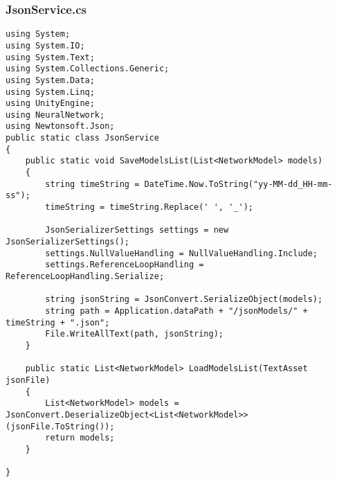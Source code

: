 \documentclass[12pt,a4paper]{article}
\begin{document}
\subsubsection*{JsonService.cs}
\begin{lstlisting}
using System;
using System.IO;
using System.Text;
using System.Collections.Generic;
using System.Data;
using System.Linq;
using UnityEngine;
using NeuralNetwork;
using Newtonsoft.Json;
public static class JsonService
{
    public static void SaveModelsList(List<NetworkModel> models)
    {
        string timeString = DateTime.Now.ToString("yy-MM-dd_HH-mm-ss");
        timeString = timeString.Replace(' ', '_');

	    JsonSerializerSettings settings = new JsonSerializerSettings();
	    settings.NullValueHandling = NullValueHandling.Include;
	    settings.ReferenceLoopHandling = ReferenceLoopHandling.Serialize;

        string jsonString = JsonConvert.SerializeObject(models);
        string path = Application.dataPath + "/jsonModels/" + timeString + ".json";
        File.WriteAllText(path, jsonString);
    }

    public static List<NetworkModel> LoadModelsList(TextAsset jsonFile)
    {
        List<NetworkModel> models = JsonConvert.DeserializeObject<List<NetworkModel>>(jsonFile.ToString());
    	return models;
    }

}
\end{lstlisting}
\pagebreak
\end{document}
